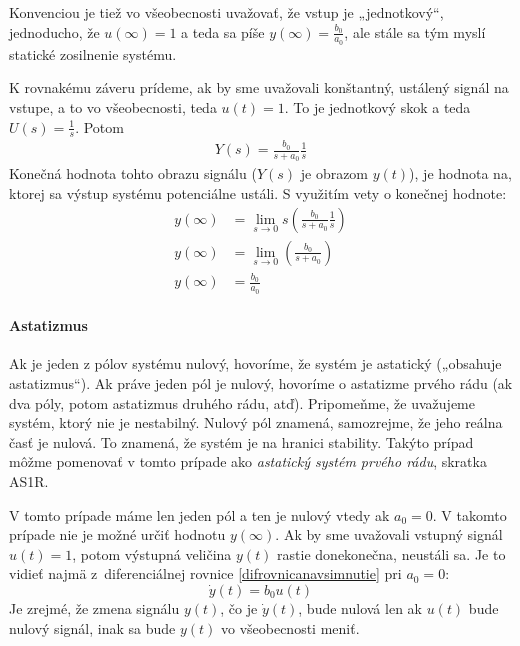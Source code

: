 \documentclass[a4paper, 10pt, ]{article}
\begin{document}
Konvenciou je tiež vo všeobecnosti uvažovať, že vstup je „jednotkový“, jednoducho, že $u(\infty) = 1$ a teda sa píše $y(\infty) = \frac{b_0 }{a_0}$, ale stále sa tým myslí statické zosilnenie systému.

K rovnakému záveru prídeme, ak by sme uvažovali konštantný, ustálený signál na vstupe, a to vo všeobecnosti, teda $u(t) = 1$. To je jednotkový skok a teda $U(s) = \frac{1}{s}$. Potom
\begin{align}
    Y(s) = \frac{b_0}{s + a_0} \frac{1}{s}
\end{align}
Konečná hodnota tohto obrazu signálu ($Y(s)$ je obrazom $y(t)$), je hodnota na, ktorej sa výstup systému potenciálne ustáli. S využitím vety o konečnej hodnote:
\begin{subequations}
    \begin{align}
        y(\infty) &= \lim_{s \to 0} s \left( \frac{b_0}{s + a_0} \frac{1}{s} \right) \\
        y(\infty) &= \lim_{s \to 0} \left( \frac{b_0}{s + a_0}  \right) \\
        y(\infty) &=  \frac{b_0}{a_0}
    \end{align}
\end{subequations}





\paragraph{Astatizmus}

Ak je jeden z pólov systému nulový, hovoríme, že systém je astatický („obsahuje astatizmus“). Ak práve jeden pól je nulový, hovoríme o astatizme prvého rádu (ak dva póly, potom astatizmus druhého rádu, atď). Pripomeňme, že uvažujeme systém, ktorý nie je nestabilný. Nulový pól znamená, samozrejme, že jeho reálna časť je nulová. To znamená, že systém je na hranici stability. Takýto prípad môžme pomenovať v tomto prípade ako \emph{astatický systém prvého rádu}, skratka AS1R.

V tomto prípade máme len jeden pól a ten je nulový vtedy ak $a_0 = 0$. V takomto prípade nie je možné určiť hodnotu $y(\infty)$. Ak by sme uvažovali vstupný signál $u(t) = 1$, potom výstupná veličina $y(t)$ rastie donekonečna, neustáli sa. Je to vidieť najmä z~diferenciálnej rovnice \eqref{difrovnicanavsimnutie} pri $a_0 = 0$:
\begin{equation}
    \dot y(t) = b_0 u(t)
\end{equation}
Je zrejmé, že zmena signálu $y(t)$, čo je $\dot y(t)$, bude nulová len ak $u(t)$ bude nulový signál, inak sa bude $y(t)$ vo všeobecnosti meniť.
\end{document}
